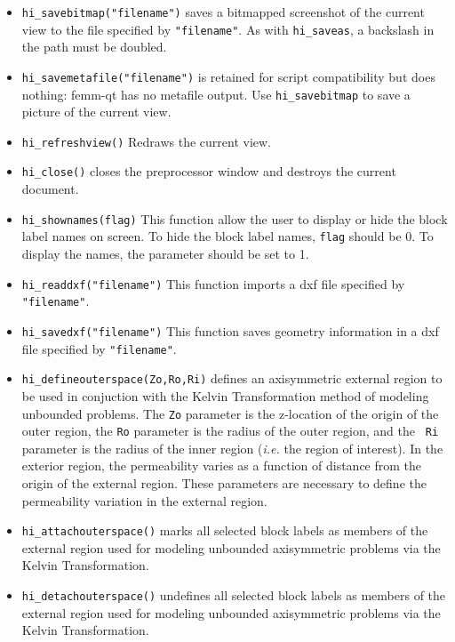 \begin{itemize}
\item \texttt{hi\_savebitmap("filename")} saves a bitmapped screenshot of the current
view to the file specified by \texttt{"filename"}.  As with
\texttt{hi\_saveas}, a backslash in the path must be doubled.

\item \texttt{hi\_savemetafile("filename")} is retained for script
compatibility but does nothing: femm-qt has no metafile output. Use
\texttt{hi\_savebitmap} to save a picture of the current view.

\item \texttt{hi\_refreshview()} Redraws the current view.

\item \texttt{hi\_close()} closes the preprocessor window and
destroys the current document.

\item \texttt{hi\_shownames(flag)} This function allow the user to display or hide the
block label names on screen. To hide the block label names,
\texttt{flag} should be 0. To display the names, the parameter
should be set to 1.

\item{\tt hi\_readdxf("filename")} This function imports a dxf file specified by {\tt "filename"}.

\item{\tt hi\_savedxf("filename")} This function saves geometry information in a dxf file specified by {\tt "filename"}.

\item{\tt hi\_defineouterspace(Zo,Ro,Ri)} defines
an axisymmetric external region to be used in conjuction with the
Kelvin Transformation method of modeling unbounded problems.  The
{\tt Zo} parameter is the z-location of the origin of the outer region,
the {\tt Ro} parameter is the radius of the outer region, and the {\tt
Ri} parameter is the radius of the inner region ({\em i.e.} the region of
interest). In the exterior region, the permeability varies as a function of
distance from the origin of the external region.  These parameters
are necessary to define the permeability variation in the external
region.

\item{\tt hi\_attachouterspace()} marks all
selected block labels as members of the external region used for
modeling unbounded axisymmetric problems via the Kelvin
Transformation.

\item{\tt hi\_detachouterspace()} undefines all selected block labels
as members of the external region used for modeling unbounded axisymmetric
problems via the Kelvin Transformation.


\end{itemize}

